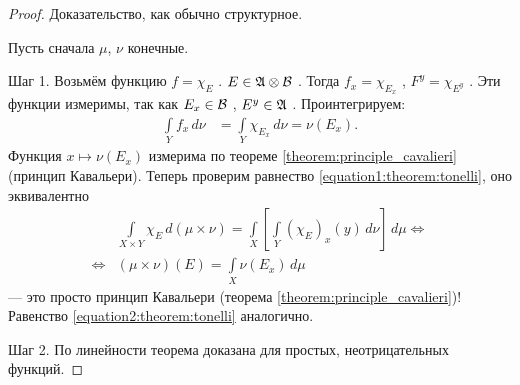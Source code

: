 \begin{proof}
 Доказательство, как обычно структурное.

 Пусть сначала $\mu$, $\nu$ конечные.

 Шаг 1. Возьмём функцию $f = \chi_E$ . $E \in \mathfrak{A} \otimes \mathcal{B}$ . Тогда $f_x = \chi_{E_x}$ , $F^{y} = \chi_{E^{y}}$ . Эти функции измеримы, так как $E_x \in \mathcal{B}$ , $E^{y} \in \mathfrak{A}$ . Проинтегрируем:
 \begin{align*}
  \int\limits_{Y} f_x \, d\nu &= \int\limits_{Y} \chi_{E_x} \, d\nu = \nu(E_x) 
  .\end{align*} Функция $x \mapsto \nu(E_x)$  измерима по теореме \ref{theorem:principle_cavalieri} (принцип Кавальери). Теперь проверим равнество \eqref{equation1:theorem:tonelli}, оно эквивалентно \begin{align*}
 &\int\limits_{X \times Y} \chi_E \, d(\mu \times \nu)  = \int\limits_{X} \left[ \int\limits_{Y} (\chi_E)_x(y) \, d\nu   \right] \, d\mu    \iff \\
  \iff &  (\mu \times \nu)(E) = \int\limits_{X} \nu(E_x) \, d\mu  
 \end{align*} --- это просто принцип Кавальери (теорема \ref{theorem:principle_cavalieri})! Равенство \eqref{equation2:theorem:tonelli} аналогично.

 Шаг 2. По линейности теорема доказана для простых, неотрицательных функций.


\end{proof}
